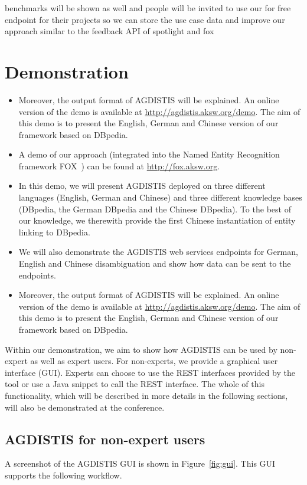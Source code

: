 benchmarks will be shown as well and people will be invited to use our for free endpoint for their projects so we can store the use case data and improve our approach similar to the feedback API of spotlight and fox


 
\section{Demonstration}
\begin{itemize}
\item Moreover, the output format of AGDISTIS will be explained. 
An online version of the demo is available at \url{http://agdistis.aksw.org/demo}.
The aim of this demo is to present the English, German and Chinese version of our framework based on DBpedia.


\item A demo of our approach (integrated into the Named Entity Recognition framework FOX~\cite{FOX}) can be found at \url{http://fox.aksw.org}. 
\item In this demo, we will present AGDISTIS deployed on three different languages (English, German and Chinese) and three different knowledge bases (DBpedia, the German DBpedia and the Chinese DBpedia).
To the best of our knowledge, we therewith provide the first Chinese instantiation of entity linking to DBpedia.
\item We will also demonstrate the AGDISTIS web services endpoints for German, English and Chinese disambiguation and show how data can be sent to the endpoints.
\item Moreover, the output format of AGDISTIS will be explained.
An online version of the demo is available at \url{http://agdistis.aksw.org/demo}.
The aim of this demo is to present the English, German and Chinese version of our framework based on DBpedia.
\end{itemize}

Within our demonstration, we aim to show how AGDISTIS can be used by non-expert as well as expert users.
For non-experts, we provide a graphical user interface (GUI).
Experts can choose to use the REST interfaces provided by the tool or use a Java snippet to call the REST interface.
The whole of this functionality, which will be described in more details in the following sections, will also be demonstrated at the conference.

\subsection{AGDISTIS for non-expert users}
A screenshot of the AGDISTIS GUI is shown in Figure~\ref{fig:gui}.
This GUI supports the following workflow.

